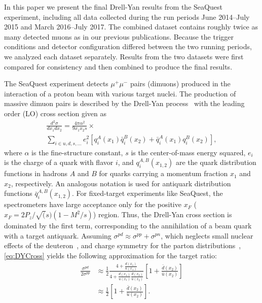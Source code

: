\documentclass[reprint,aps,unsortedaddress,superscriptaddress,prl,floatfix,showpacs,linenumbers]{revtex4-2}
\begin{document}
In this paper we present the final Drell-Yan results from the SeaQuest experiment,
including all data collected during the run periods June 2014--July 2015 and March 2016--July 2017.
The combined dataset contains roughly twice as many detected muons as in our previous publications.
Because the trigger conditions and detector configuration differed between the two running periods,
we analyzed each dataset separately.
Results from the two datasets were first compared for consistency and then combined to produce the final results.

The SeaQuest experiment detects $\mu^+\mu^-$ pairs (dimuons) produced in
the interaction of a proton beam with various target nuclei. The production
of massive dimuon pairs is described by the Drell-Yan
process~\cite{drell1970} with the leading order (LO) cross section given as
\begin{multline}
	\frac{d^2\sigma}{dx_1dx_2}=\frac{4\pi \alpha^2}{9x_1x_2s} \times
	\label{eq:DYCross} \\
	\sum_{i\in u,d,s,\dots} e_i^2 \left[q_i^A\left(x_1\right) \bar q_i^B\left(x_2\right) + \bar q_i^A\left(x_1\right)
		q_i^B\left(x_2\right)\right],
\end{multline}
where $\alpha$ is the fine-structure constant,
$s$ is the center-of-mass energy squared,
$e_i$ is the charge of a quark
with flavor $i$, and $q_i^{A,B}\left(x_{1,2}\right)$ are the quark
distribution functions in hadrons $A$ and $B$
for quarks carrying a momentum fraction $x_1$ and $x_2$, respectively.
An analogous notation is used for antiquark distribution functions
$\bar q_i^{A,B}\left(x_{1,2}\right)$.
For fixed-target experiments like SeaQuest, the spectrometers have
large acceptance only for the positive $x_F$ ($x_F = 2P_z/\sqrt(s)\left(1-M^2/s\right)$) region. %
Thus, the Drell-Yan cross section is dominated by
the first term, corresponding to the annihilation of a beam quark with
a target antiquark. Assuming
$\sigma^{pd} \approx \sigma^{pp} + \sigma^{pn}$,
which neglects small nuclear effects of the
deuteron~\cite{kumano1998,ehlers2014},
and charge symmetry for the parton distributions~\cite{londergan2010},
\cref{eq:DYCross} yields the following approximation for the target ratio:
\begin{equation}
	\begin{split}
		\frac{\sigma^{pd}}{2\sigma^{pp}} & \approx
		\frac{1}{2} \frac{4+\frac{d\left(x_1\right)}
			{u\left(x_1\right)}}{4+\frac{d\left(x_1\right)}
			{u\left(x_1\right)}\frac{\bar d\left(x_2\right)}{\bar u\left(x_2\right)}}
		\left[1+\frac{\bar d\left(x_2\right)}{\bar u\left(x_2\right)}\right]                         \\
		                                 & \approx \frac{1}{2} \left[1+\frac{\bar d\left(x_2\right)}
			{\bar u\left(x_2\right)}\right].
	\end{split}
	\label{eq:crRatio}
\end{equation}
\end{document}
